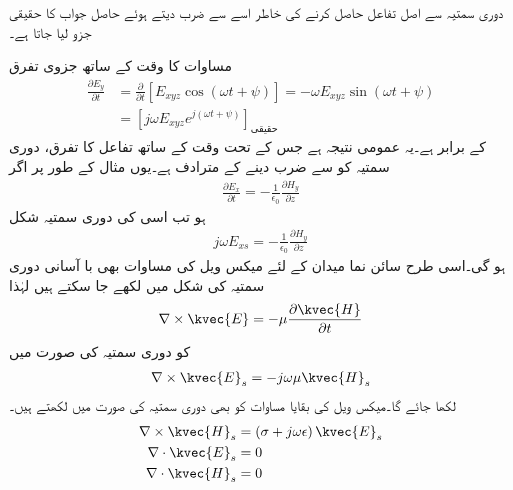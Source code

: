 دوری سمتیہ سے اصل تفاعل حاصل کرنے کی خاطر اسے  سے ضرب دیتے ہوئے حاصل جواب کا حقیقی جزو لیا جاتا ہے۔

مساوات  کا وقت کے ساتھ جزوی تفرق
\begin{align*}
\frac{\partial E_y}{\partial t}&=\frac{\partial }{\partial t} [E_{xyz} \cos(\omega t +\psi)]=-\omega E_{xyz} \sin (\omega t +\psi)\\
&=\left[j \omega  E_{xyz} e^{j(\omega t +\psi)} \right]_{\textrm{حقیقی}}
\end{align*} 
کے برابر ہے۔یہ عمومی نتیجہ ہے جس کے تحت وقت کے ساتھ تفاعل کا تفرق، دوری سمتیہ کو  سے ضرب دینے کے مترادف ہے۔یوں مثال کے طور پر اگر
\begin{align*}
\frac{\partial E_x}{\partial t}=-\frac{1}{\epsilon_0} \frac{\partial H_y}{\partial z}
\end{align*}
ہو تب اسی کی دوری سمتیہ شکل
\begin{align*}
j \omega E_{xs}=-\frac{1}{\epsilon_0} \frac{\partial H_y}{\partial z}
\end{align*}
ہو گی۔اسی طرح سائن نما میدان کے لئے میکس ویل کی مساوات بھی با آسانی دوری سمتیہ کی شکل میں لکھے جا سکتے ہیں لہٰذا
\begin{align*}
\nabla \times \kvec{E}=-\mu\frac{\partial \kvec{H}}{\partial t}
\end{align*} 
کو دوری سمتیہ کی صورت میں
\begin{align}   \label{مساوات_موج_میکس_ویل_دوری_سمتیہ_شکل_الف}
\nabla \times \kvec{E}_s=-j \omega \mu \kvec{H}_s
\end{align}
لکھا جائے گا۔میکس ویل کی بقایا مساوات کو بھی دوری سمتیہ کی صورت میں لکھتے ہیں۔
\begin{align}
\nabla \times \kvec{H}_s &=\left(\sigma +j \omega \epsilon \right) \kvec{E}_s   \label{مساوات_موج_میکس_ویل_دوری_سمتیہ_شکل_ب}\\
\nabla \cdot \kvec{E}_s &=0   \label{مساوات_موج_میکس_ویل_دوری_سمتیہ_شکل_پ}\\
\nabla \cdot \kvec{H}_s&=0   \label{مساوات_موج_میکس_ویل_دوری_سمتیہ_شکل_ت}
\end{align}

